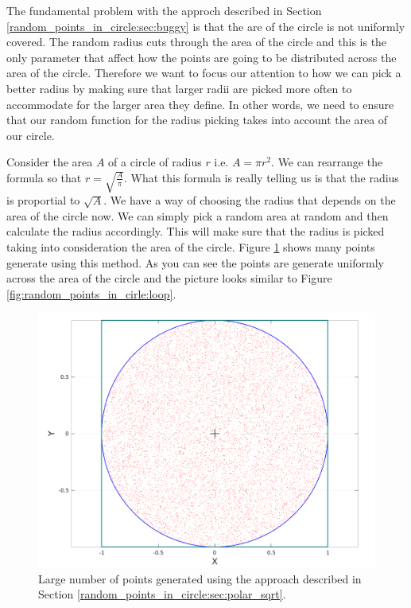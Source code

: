 The fundamental problem with the approch described in Section \ref{random_points_in_circle:sec:buggy} is that the are of the circle is not uniformly covered. The random radius cuts through the area of the circle and this is the only parameter that affect how the points are going to be distributed across the area of the circle. Therefore we want to focus our attention to  how we can  pick a better radius by making sure that larger radii are picked more often to accommodate for the larger area they define. In other words, we need to ensure that our random function for the radius picking takes into account the area of our circle. 

Consider the area $A$ of a circle of radius $r$ i.e.  $A = \pi r^2$. We can rearrange the formula so that $r = \sqrt{\frac{A}{\pi}}$. What this formula is really telling us is that the radius is proportial to $\sqrt{A}$. We have a way of choosing the radius that depends on the area of the circle now. We can simply pick a random area at  random and then calculate the radius accordingly. This will make sure that the radius is picked taking into consideration the area of the circle. Figure \ref{fig:random_points_in_cirle:polar_sqrt} shows many points generate using this method. As you can see the points are generate uniformly across the area of the circle and the picture looks similar to Figure \ref{fig:random_points_in_cirle:loop}.


\begin{figure}
	\label{fig:random_points_in_cirle:polar_sqrt}
	\centering
	\includegraphics[scale=0.3]{sources/random_points_in_circle/images/sqrt_points}
	\caption{Large number of points generated using the approach described in Section \ref{random_points_in_circle:sec:polar_sqrt}.}
\end{figure}

